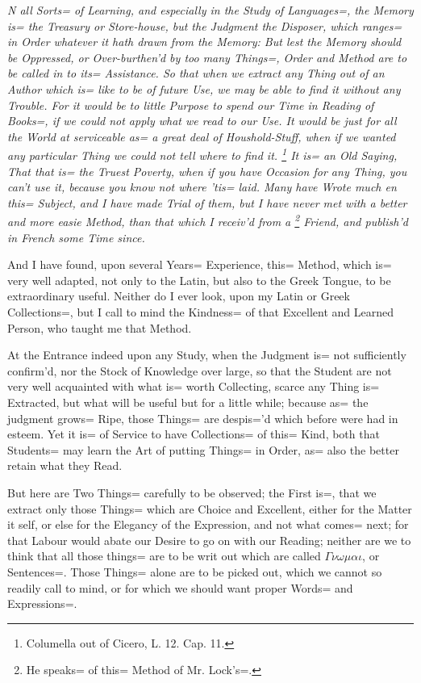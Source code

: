 {\itshape
\setlength{\shapeindent}{\dimexpr \dropcapwidth+1em\relax}
\setlength{\shapelength}{\textwidth}
\addtolength{\shapelength}{-\shapeindent}
\shapeindent \shapelength
\shapeindent \shapelength
0pt \textwidth
\noindent
N all Sorts= of Learning,
and especially in the Study of Languages=,
the Memory is= the \emph{Treasury or Store-house},
but the Judgment the \emph{Disposer},
which ranges= in Order whatever it hath drawn from the Memory:
But lest the Memory should be Oppressed,
or Over-burthen'd by too many Things=,
Order and Method are to be called in to its= Assistance.
So that when we extract any Thing out of an Author which is= like to be of future Use,
we may be able to find it without any Trouble.
For it would be to little Purpose to spend our Time in Reading of Books=,
if we could not apply what we read to our Use.
It would be just for all the World at serviceable as= a great deal of \emph{Houshold-Stuff},
when if we wanted any particular Thing we could not tell where to find it.
\footnote{Columella out of Cicero, L. 12. Cap. 11.}%
\emph{It is= an Old Saying,
    That that is= the Truest Poverty,
    when if you have Occasion for any Thing,
    you can't use it,
    because you know not where 'tis= laid.}
Many have Wrote much en this= Subject,
and I have made Trial of them,
but I have never met with a better and more easie Method,
than that which I receiv'd from a \footnote{He speaks= of this= Method of Mr. Lock's=.} Friend,
and publish'd in French some Time since.

And I have found, upon several Years= Experience,
this= Method, which is= very well adapted,
not only to the Latin, but also to the Greek Tongue,
to be extraordinary useful.
Neither do I ever look, upon my Latin or Greek Collections=,
but I call to mind the Kindness= of that Excellent and Learned Person,
who taught me that Method.

At the Entrance indeed upon any Study,
when the Judgment is= not sufficiently confirm'd,
nor the Stock of Knowledge over large,
so that the Student are not very well acquainted with what is= worth Collecting,
scarce any Thing is= Extracted,
but what will be useful but for a little while;
because as= the judgment grows= Ripe,
those Things= are despis='d which before were had in esteem.
Yet it is= of Service to have Collections= of this= Kind,
both that Students= may learn the Art of putting Things= in Order,
as= also the better retain what they Read.

But here are Two Things= carefully to be observed;
the First is=, that we extract only those Things= which are Choice and Excellent,
either for the Matter it self,
or else for the Elegancy of the Expression,
and not what comes= next;
for that Labour would abate our Desire to go on with our Reading;
neither are we to think that all those things= are to be writ out which are called
$\Gamma\nu\omega\mu\alpha\iota$, or Sentences=.
Those Things= alone are to be picked out,
which we cannot so readily call to mind,
or for which we should want proper Words= and Expressions=.

}
